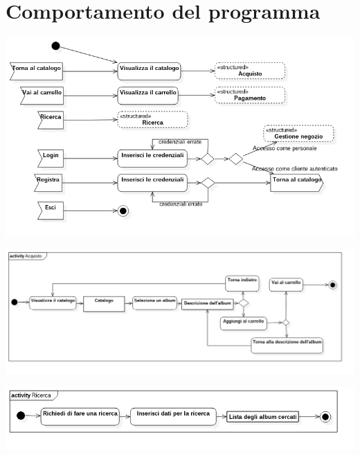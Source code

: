 \chapter{Comportamento del programma}

\begin{center}
    \includegraphics[width=\textwidth]{diagram/activity-generale.png}
\end{center}

\begin{center}
    \includegraphics[width=\textwidth]{diagram/activity-acquisto.png}
\end{center}

\begin{center}
    \includegraphics[width=\textwidth]{diagram/activity-ricerca.png}
\end{center}

